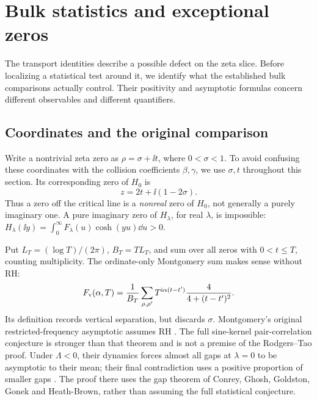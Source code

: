 \section{Bulk statistics and exceptional zeros}\label{sec:complex-statistics}

The transport identities describe a possible defect on the zeta slice.
Before localizing a statistical test around it, we identify what the
established bulk comparisons actually control. Their positivity and
asymptotic formulas concern different observables and different
quantifiers.

\subsection{Coordinates and the original comparison}
Write a nontrivial zeta zero as \(\rho=\sigma+\ii t\), where
\(0<\sigma<1\). To avoid confusing these coordinates with the
collision coefficients \(\beta,\gamma\), we use \(\sigma,t\)
throughout this section. Its corresponding zero of \(H_0\) is
\begin{equation}\label{eq:zeta-H-zero-map}
 z=2t+\ii(1-2\sigma).
\end{equation}
Thus a zero off the critical line is a \emph{nonreal} zero of
\(H_0\), not generally a purely imaginary one. A pure imaginary
zero of \(H_\lambda\), for real \(\lambda\), is impossible:
\(H_\lambda(\ii y)=\int_0^\infty F_\lambda(u)\cosh(yu)\dd u>0\).

Put \(L_T=(\log T)/(2\pi)\), \(B_T=TL_T\), and sum over all
zeros with \(0<t\le T\), counting multiplicity. The ordinate-only
Montgomery sum makes sense without RH:
\begin{equation}\label{eq:F-vertical}
 F_{\rm v}(\alpha,T)=\frac1{B_T}\sum_{\rho,\rho'}
 T^{\mathrm i\alpha(t-t')}\frac4{4+(t-t')^2}.
\end{equation}
Its definition records vertical separation, but discards \(\sigma\).
Montgomery's original restricted-frequency asymptotic assumes RH
\cite[Theorem, equations (1)--(2)]{Montgomery1973}.
The full sine-kernel pair-correlation conjecture is stronger than
that theorem and is not a premise of the Rodgers--Tao proof.
Under \(\Lambda<0\), their dynamics forces almost all gaps at
\(\lambda=0\) to be asymptotic to their mean; their final
contradiction uses a positive proportion of smaller gaps
\cite[Section~9, equation (93)]{RodgersTao2020}. The proof there
uses the gap theorem of Conrey, Ghosh, Goldston, Gonek and
Heath-Brown, rather than assuming the full statistical conjecture.

